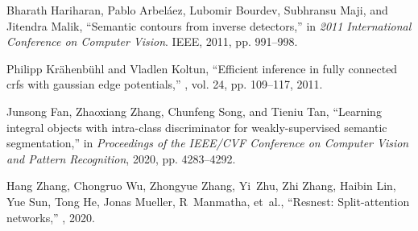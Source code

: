 \documentclass{article}
\begin{document}
\begin{thebibliography}{10}
Bharath Hariharan, Pablo Arbel{\'a}ez, Lubomir Bourdev, Subhransu Maji, and
  Jitendra Malik,
\newblock ``Semantic contours from inverse detectors,''
\newblock in {\em 2011 International Conference on Computer Vision}. IEEE,
  2011, pp. 991--998.

Philipp Kr{\"a}henb{\"u}hl and Vladlen Koltun,
\newblock ``Efficient inference in fully connected crfs with gaussian edge
  potentials,''
, vol. 24, pp.
  109--117, 2011.

Junsong Fan, Zhaoxiang Zhang, Chunfeng Song, and Tieniu Tan,
\newblock ``Learning integral objects with intra-class discriminator for
  weakly-supervised semantic segmentation,''
\newblock in {\em Proceedings of the IEEE/CVF Conference on Computer Vision and
  Pattern Recognition}, 2020, pp. 4283--4292.

Hang Zhang, Chongruo Wu, Zhongyue Zhang, Yi~Zhu, Zhi Zhang, Haibin Lin, Yue
  Sun, Tong He, Jonas Mueller, R~Manmatha, et~al.,
\newblock ``Resnest: Split-attention networks,''
, 2020.

\end{thebibliography}
\end{document}
